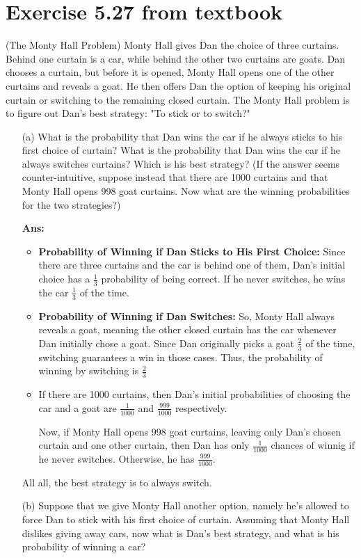 \documentclass[12pt]{ut-thesis}
\theoremstyle{definition}
\begin{document}
	\section*{Exercise 5.27 from textbook}
	(The Monty Hall Problem) Monty Hall gives Dan the choice of three curtains. 
	Behind one curtain is a car, while behind the other two curtains are goats. 
	Dan chooses a curtain, but before it is opened, Monty Hall opens one of the 
	other curtains and reveals a goat. He then offers Dan the option of keeping 
	his original curtain or switching to the remaining closed curtain. 
	The Monty Hall problem is to figure out Dan's best strategy: "To stick or to switch?"
	\begin{itemize}
		\item[(a)] What is the probability that Dan wins the car if he always 
		sticks to his first choice of curtain? What is the probability that 
		Dan wins the car if he always switches curtains? Which is his best strategy? 
		(If the answer seems counter-intuitive, suppose instead that there are 1000 
		curtains and that Monty Hall opens 998 goat curtains. Now what are the winning 
		probabilities for the two strategies?)

		\textbf{Ans:}
		\begin{itemize}
			\item \textbf{Probability of Winning if Dan Sticks to His First Choice:}
			Since there are three curtains and the car is behind one of them, 
			Dan's initial choice has a $\frac{1}{3}$ probability of being correct. If he never 
			switches, he wins the car $\frac{1}{3}$ of the time.
			\item \textbf{Probability of Winning if Dan Switches:}
			So, Monty Hall always reveals a goat, meaning the other closed curtain has the 
			car whenever Dan initially chose a goat.
			Since Dan originally picks a goat $\frac{2}{3}$ of the time, 
			switching guarantees a win in those cases. 
			Thus, the probability of winning by switching is $\frac{2}{3}$
			\item If there are 1000 curtains, then Dan's initial probabilities of choosing the 
			car and a goat are $\frac{1}{1000}$ and $\frac{999}{1000}$ respectively.

			Now, if Monty Hall opens 998 goat curtains, leaving only Dan’s chosen curtain 
			and one other curtain, then Dan has only $\frac{1}{1000}$ chances of winnig if 
			he never switches. Otherwise, he has $\frac{999}{1000}$.
		\end{itemize} 
		All all, the best strategy is to always switch.
		\item[(b)]Suppose that we give Monty Hall another option, namely he's allowed to 
		force Dan to stick with his first choice of curtain. Assuming that Monty Hall 
		dislikes giving away cars, now what is Dan's best strategy, and what is his probability
		of winning a car?


\end{itemize}
\end{document}
